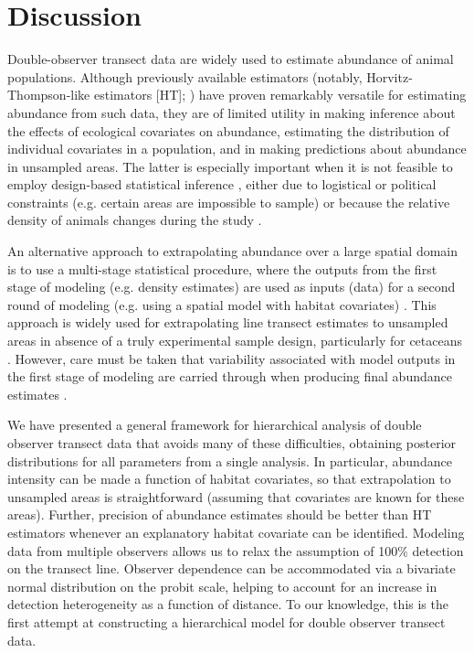 \documentclass[10pt]{article}
\begin{document}
\section*{Discussion}

Double-observer transect data are widely used to estimate abundance of animal populations. Although previously available estimators (notably, Horvitz-Thompson-like estimators [HT]; \cite{BorchersEtAl2002}) have proven remarkably versatile for estimating abundance from such data, they are of limited utility in making inference about the effects of ecological covariates on abundance, estimating the distribution of individual covariates in a population, and in making predictions about abundance in unsampled areas.
The latter is especially important when it is not feasible to employ design-based statistical inference \cite{Cochran1977}, either due to logistical or political constraints (e.g. certain areas are impossible to sample) or because the relative density of animals changes during the study \cite{VerHoefEtAl2011}.

An alternative approach to extrapolating abundance over a large spatial domain is to use a multi-stage statistical procedure, where the outputs from the first stage of modeling (e.g. density estimates) are used as inputs (data) for a second round of modeling (e.g. using a spatial model with habitat covariates) \cite{Forney2000,HedleyBuckland2004}.  This approach is widely used for extrapolating line transect estimates to unsampled areas in absence of a truly experimental sample design, particularly for cetaceans \cite{RedfernEtAl2006,BeckerEtAl2000}.  However, care must be taken that variability associated with model outputs in the first stage of modeling are carried through when producing final abundance estimates \cite{VerHoefEtAl2011}.

We have presented a general framework for hierarchical analysis of double observer transect data that avoids many of these difficulties, obtaining posterior distributions for all parameters from a single analysis.  In particular, abundance intensity can be made a function of habitat covariates, so that extrapolation to unsampled areas is straightforward (assuming that covariates are known for these areas).  Further, precision of abundance estimates should be better than HT estimators whenever an explanatory habitat covariate can be identified.  Modeling data from multiple observers allows us to relax the assumption of 100\% detection on the transect line.  Observer dependence can be accommodated via a bivariate normal distribution on the probit scale, helping to account for an increase in detection heterogeneity as a function of distance.  To our knowledge, this is the first attempt at constructing a hierarchical model for double observer transect data.
\end{document}

